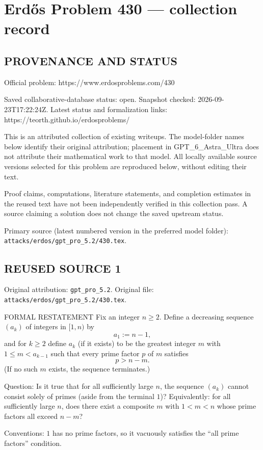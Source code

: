 \section*{Erd\H{o}s Problem 430 --- collection record}

\subsection*{PROVENANCE AND STATUS}
Official problem: https://www.erdosproblems.com/430

Saved collaborative-database status: open.
Snapshot checked: 2026-09-23T17:22:24Z.
Latest status and formalization links: https://teorth.github.io/erdosproblems/

This is an attributed collection of existing writeups. The model-folder names below identify their original attribution; placement in GPT\_6\_Astra\_Ultra does not attribute their mathematical work to that model. All locally available source versions selected for this problem are reproduced below, without editing their text.

Proof claims, computations, literature statements, and completion estimates in the reused text have not been independently verified in this collection pass. A source claiming a solution does not change the saved upstream status.

Primary source (latest numbered version in the preferred model folder): \texttt{attacks/erdos/gpt\_pro\_5.2/430.tex}.

\subsection*{REUSED SOURCE 1}
Original attribution: \texttt{gpt\_pro\_5.2}.
Original file: \texttt{attacks/erdos/gpt\_pro\_5.2/430.tex}.


FORMAL RESTATEMENT
Fix an integer $n\ge 2$. Define a decreasing sequence $(a_k)$ of integers in $[1,n)$ by
\[
 a_1:=n-1,
\]
and for $k\ge 2$ define $a_k$ (if it exists) to be the greatest integer $m$ with $1\le m<a_{k-1}$ such that every prime factor $p$ of $m$ satisfies
\[
 p>n-m.
\]
(If no such $m$ exists, the sequence terminates.)

Question: Is it true that for all sufficiently large $n$, the sequence $(a_k)$ cannot consist solely of primes (aside from the terminal $1$)?
Equivalently: for all sufficiently large $n$, does there exist a composite $m$ with $1<m<n$ whose prime factors all exceed $n-m$?

Conventions: $1$ has no prime factors, so it vacuously satisfies the “all prime factors” condition.

